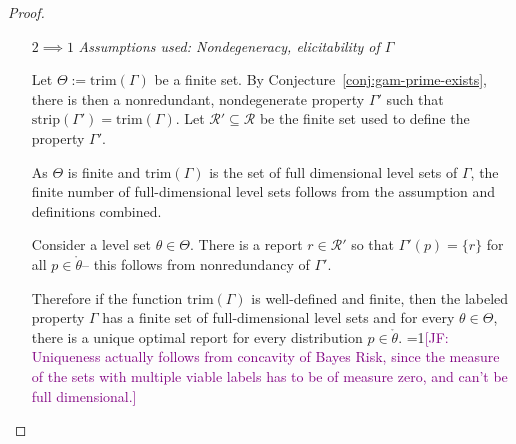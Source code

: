 \documentclass[12pt]{article}
\newcommand{\Comments}{1}
\newcommand{\mynote}[2]{\ifnum\Comments=1\textcolor{#1}{#2}\fi}
\newcommand{\jessie}[1]{\mynote{purple}{[JF: #1]}}
\newcommand{\E}{\mathbb{E}}
\newcommand{\R}{\mathcal{R}}
\newcommand{\inter}[1]{\mathring{#1}}%
\newcommand{\trim}{\mathrm{trim}}
\newcommand{\strip}{\mathrm{strip}}
\DeclareMathOperator*{\argmin}{arg\,min}
\begin{document}
\begin{proof}
\begin{enumerate}
%
%
%



\item[$2 \implies 1$]  
\emph{Assumptions used: Nondegeneracy, elicitability of $\Gamma$}

Let $\Theta := \trim(\Gamma)$ be a finite set.
By Conjecture~\ref{conj:gam-prime-exists}, there is then a nonredundant, nondegenerate property $\Gamma'$ such that $\strip(\Gamma') = \trim(\Gamma)$.
Let $\R' \subseteq \R$ be the finite set used to define the property $\Gamma'$.

As $\Theta$ is finite and $\trim(\Gamma)$ is the set of full dimensional level sets of $\Gamma$, the finite number of full-dimensional level sets follows from the assumption and definitions combined.

Consider a level set $\theta\in \Theta$.
There is a report $r \in \R'$ so that $\Gamma'(p) = \{r\}$ for all $p \in \inter{\theta}$-- this follows from nonredundancy of $\Gamma'$.

Therefore if the function $\trim(\Gamma)$ is well-defined and finite, then the labeled property $\Gamma$ has a finite set of full-dimensional level sets and for every $\theta \in \Theta$, there is a unique optimal report for every distribution $p \in \inter{\theta}$.
\jessie{Uniqueness actually follows from concavity of Bayes Risk, since the measure of the sets with multiple viable labels has to be of measure zero, and can't be full dimensional.}



\end{enumerate}
\end{proof}
\end{document}
